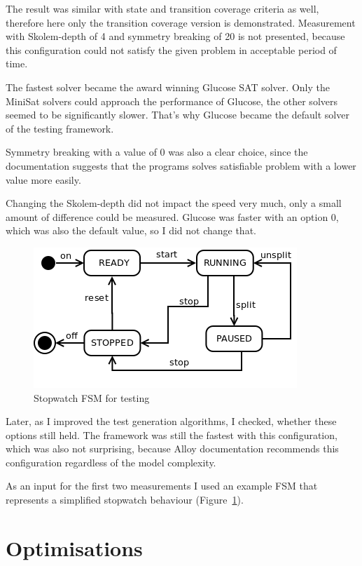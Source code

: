 The result was similar with state and transition coverage criteria as well, therefore here only the transition coverage version is demonstrated. Measurement with Skolem-depth of 4 and symmetry breaking of 20 is not presented, because this configuration could not satisfy the given problem in acceptable period of time.

The fastest solver became the award winning Glucose SAT solver. Only the MiniSat solvers could approach the performance of Glucose, the other solvers seemed to be significantly slower. That's why Glucose became the default solver of the testing framework.

Symmetry breaking with a value of 0 was also a clear choice, since the documentation suggests that the programs solves satisfiable problem with a lower value more easily. 

Changing the Skolem-depth did not impact the speed very much, only a small amount of difference could be measured. Glucose was faster with an option 0, which was also the default value, so I did not change that.

\begin{figure}[htp]
\centering
\includegraphics[scale=0.5]{figures/measurements_stopwatch}
\caption{Stopwatch FSM for testing}
\label{fig:measurements_stopwatch}
\end{figure}

Later, as I improved the test generation algorithms, I checked, whether these options still held. The framework was still the fastest with this configuration, which was also not surprising, because Alloy documentation recommends this configuration regardless of the model complexity.

As an input for the first two measurements I used an example FSM that represents a simplified stopwatch behaviour (Figure~\ref{fig:measurements_stopwatch}). 


\section{Optimisations}
\label{sec:optimalisations}

